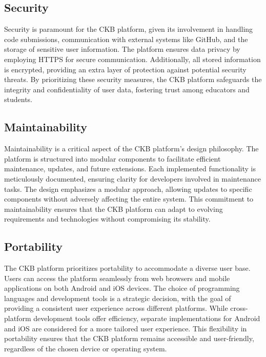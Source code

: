 \subsection{Security}
\label{subsec:security}%
Security is paramount for the CKB platform, given its involvement in handling code submissions, communication with external systems like GitHub, and the storage of sensitive user information. 
The platform ensures data privacy by employing HTTPS for secure communication. Additionally, all stored information is encrypted, providing an extra layer of protection against potential security threats. 
By prioritizing these security measures, the CKB platform safeguards the integrity and confidentiality of user data, fostering trust among educators and students.

\subsection{Maintainability}
\label{subsec:maintainability}%
Maintainability is a critical aspect of the CKB platform's design philosophy. The platform is structured into modular components to facilitate efficient maintenance, updates, and future extensions. 
Each implemented functionality is meticulously documented, ensuring clarity for developers involved in maintenance tasks. 
The design emphasizes a modular approach, allowing updates to specific components without adversely affecting the entire system. 
This commitment to maintainability ensures that the CKB platform can adapt to evolving requirements and technologies without compromising its stability.

\subsection{Portability}
\label{subsec:portability}%
The CKB platform prioritizes portability to accommodate a diverse user base. Users can access the platform seamlessly from web browsers and mobile applications on both Android and iOS devices. 
The choice of programming languages and development tools is a strategic decision, with the goal of providing a consistent user experience across different platforms. 
While cross-platform development tools offer efficiency, separate implementations for Android and iOS are considered for a more tailored user experience. 
This flexibility in portability ensures that the CKB platform remains accessible and user-friendly, regardless of the chosen device or operating system.
